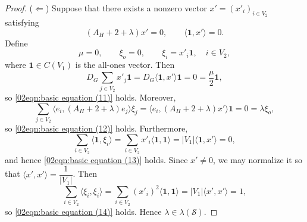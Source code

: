 \documentclass[pdflatex,sn-mathphys-num]{sn-jnl}
\theoremstyle{thmstyleone}%
\theoremstyle{thmstyletwo}%
\theoremstyle{thmstylethree}%
\begin{document}
\begin{proof}
\noindent
($\Leftarrow$)
Suppose that there exists a nonzero vector $x'=(x'_i)_{i\in V_2}$ satisfying
\[
(A_H+2+\lambda)x' = 0, \qquad
\langle \mathbf{1},x'\rangle = 0.
\]
Define
\[
\mu=0,\qquad
\xi_o=0,\qquad
\xi_i=x'_i\mathbf{1},\quad i\in V_2,
\]
where $\mathbf{1}\in C(V_1)$ is the all-ones vector. Then
\[
D_G\sum_{j\in V_2}x'_j\mathbf{1}
=
D_G\langle \mathbf{1},x'\rangle\mathbf{1}
=
0
=
\frac{\mu}{2}\mathbf{1},
\]
so \eqref{02eqn:basic equation (11)} holds. Moreover,
\[
\sum_{j\in V_2}
\langle e_i,(A_H+2+\lambda)e_j\rangle\xi_j
=
\langle e_i,(A_H+2+\lambda)x'\rangle\mathbf{1}
=
0
=
\lambda\xi_o ,
\]
so \eqref{02eqn:basic equation (12)} holds. Furthermore,
\[
\sum_{i\in V_2}\langle \mathbf{1},\xi_i\rangle
=
\sum_{i\in V_2}x'_i\langle \mathbf{1},\mathbf{1}\rangle
=
|V_1|\langle \mathbf{1},x'\rangle
=
0,
\]
and hence \eqref{02eqn:basic equation (13)} holds. 
Since $x'\neq0$, we may normalize it so that 
$\langle x',x'\rangle=\dfrac{1}{|V_1|}$. Then
\[
\sum_{i\in V_2}\langle \xi_i,\xi_i\rangle
=
\sum_{i\in V_2}(x'_i)^2\langle \mathbf{1},\mathbf{1}\rangle
=
|V_1|\langle x',x'\rangle
=
1,
\]
so \eqref{02eqn:basic equation (14)} holds. Hence $\lambda\in\lambda(\mathcal S)$.


\end{proof}
\end{document}
